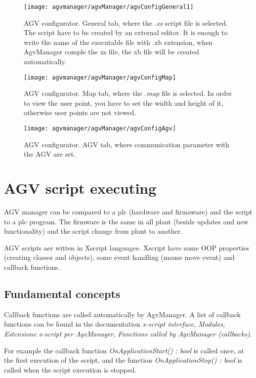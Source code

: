 \begin{figure}
	\centering\texttt{[image: agvmanager/agvManager/agvConfigGeneral1]}
	\caption{AGV configurator. General tab, where the \textit{.xs} script file is selected. The script have to be created by an external editor. It is enough to write the name of the executable file with .xb extension, when AgvManager comple the xs file, the xb file will be created automatically.}
	\label{fig:refConfigScript}
\end{figure}
\begin{figure}
	\centering\texttt{[image: agvmanager/agvManager/agvConfigMap]}
	\caption{AGV configurator. Map tab, where the \textit{.map} file is selected. In order to view the user point, you have to set the width and height of it, otherwise user points are not viewed.}
	\label{fig:refConfigMap}
\end{figure}
\begin{figure}
	\centering\texttt{[image: agvmanager/agvManager/agvConfigAgv]}
	\caption{AGV configurator. AGV tab, where communication parameter with the AGV are set.}
	\label{fig:refConfigAgv}
\end{figure}

\section{AGV script executing}
AGV manager can be compared to a plc (hardware and firmaware) and the script to a plc program. The firmware is the same in all plant (beside updates and new functionality) and the script change from plant to another.

AGV scripts aer witten in Xscript languagee. Xscript have some OOP properties (creating classes and objects), some event handling (mouse move event) and callback functions.

\subsection{Fundamental concepts}
Callback functions are called automatically by AgvManager. A list of callback functions can be found in the documentation \textit{x-script interface, Modules, Estensione x-script per AgvManager, Functions called by AgvManager (callbacks)}.

For example the callback function \textit{OnApplicationStart() : bool} is called once, at the first execution of the script, and the function \textit{OnApplicationStop() : bool} is called when the script execution is stopped.

